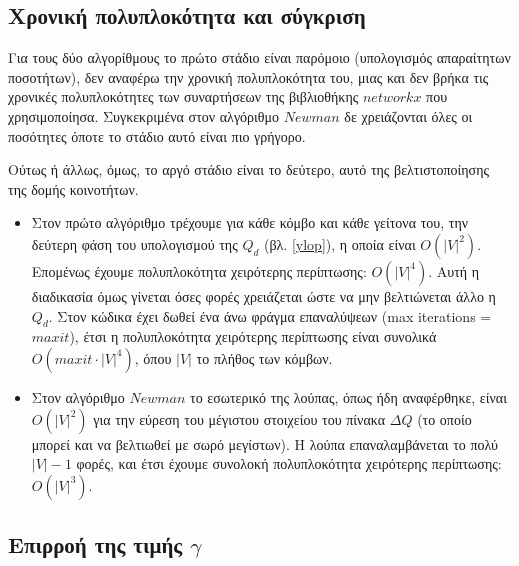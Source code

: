 \documentclass[12pt, letterpaper]{article}
\begin{document}
\subsection{Χρονική πολυπλοκότητα και σύγκριση}



Για τους δύο αλγορίθμους το πρώτο στάδιο είναι παρόμοιο (υπολογισμός απαραίτητων ποσοτήτων), δεν αναφέρω την χρονική πολυπλοκότητα
του, μιας και δεν βρήκα τις χρονικές πολυπλοκότητες των συναρτήσεων της βιβλιοθήκης
$networkx$ που χρησιμοποίησα. Συγκεκριμένα στον αλγόριθμο $Newman$ δε χρειάζονται όλες οι 
ποσότητες όποτε το στάδιο αυτό είναι πιο γρήγορο. 

Ούτως ή άλλως, όμως, το αργό στάδιο είναι το δεύτερο, αυτό της βελτιστοποίησης της 
δομής κοινοτήτων. 

\begin{itemize}
  \item Στον πρώτο αλγόριθμο τρέχουμε για κάθε κόμβο και κάθε γείτονα του, την δεύτερη
  φάση του υπολογισμού της $Q_d$ (βλ. \ref{ylop}), η οποία είναι $O(|V|^2)$. 
  Επομένως έχουμε πολυπλοκότητα χειρότερης περίπτωσης: $O(|V|^4)$. 
  Αυτή η διαδικασία όμως γίνεται όσες φορές χρειάζεται ώστε να μην βελτιώνεται άλλο 
  η $Q_d$. Στον κώδικα έχει δωθεί ένα άνω φράγμα επαναλύψεων (\textlatin{max iterations} = $maxit$),
  έτσι η πολυπλοκότητα χειρότερης περίπτωσης είναι συνολικά $O(maxit \cdot |V|^4)$,
  όπου $|V|$ το πλήθος των κόμβων.


  \item Στον αλγόριθμο $Newman$ το εσωτερικό της λούπας, όπως ήδη αναφέρθηκε, είναι 
  $O(|V|^2)$ για την εύρεση του μέγιστου στοιχείου του πίνακα $\Delta Q$ (το οποίο μπορεί 
  και να βελτιωθεί με σωρό μεγίστων). Η λούπα επαναλαμβάνεται το πολύ $|V|-1$
  φορές, και έτσι έχουμε συνολοκή πολυπλοκότητα χειρότερης περίπτωσης: $O(|V|^3)$.


\end{itemize}





\subsection{Επιρροή της τιμής $\gamma$}  \label{gamma}
\end{document}
